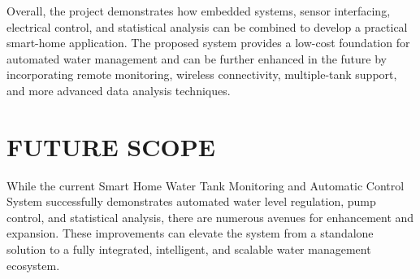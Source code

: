 \documentclass[12pt,a4paper]{article}
\begin{document}
Overall, the project demonstrates how embedded systems, sensor interfacing, electrical control, and statistical analysis can be combined to develop a practical smart-home application. The proposed system provides a low-cost foundation for automated water management and can be further enhanced in the future by incorporating remote monitoring, wireless connectivity, multiple-tank support, and more advanced data analysis techniques.
\section{FUTURE SCOPE}
While the current Smart Home Water Tank Monitoring and Automatic Control System successfully demonstrates automated water level regulation, pump control, and statistical analysis, there are numerous avenues for enhancement and expansion. These improvements can elevate the system from a standalone solution to a fully integrated, intelligent, and scalable water management ecosystem. \\
\end{document}
